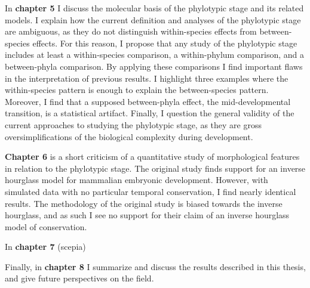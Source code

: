 In \textbf{chapter 5} I discuss the molecular basis of the phylotypic stage and its related models. I explain how the current definition and analyses of the phylotypic stage are ambiguous, as they do not distinguish within-species effects from between-species effects. For this reason, I propose that any study of the phylotypic stage includes at least a within-species comparison, a within-phylum comparison, and a between-phyla comparison. By applying these comparisons I find important flaws in the interpretation of previous results. I highlight three examples where the within-species pattern is enough to explain the between-species pattern. Moreover, I find that a supposed between-phyla effect, the mid-developmental transition, is a statistical artifact. Finally, I question the general validity of the current approaches to studying the phylotypic stage, as they are gross oversimplifications of the biological complexity during development.

\textbf{Chapter 6} is a short criticism of a quantitative study of morphological features in relation to the phylotypic stage. The original study finds support for an inverse hourglass model for mammalian embryonic development. However, with simulated data with no particular temporal conservation, I find nearly identical results. The methodology of the original study is biased towards the inverse hourglass, and as such I see no support for their claim of an inverse hourglass model of conservation.

In \textbf{chapter 7} (scepia)

Finally, in \textbf{chapter 8} I summarize and discuss the results described in this thesis, and give future perspectives on the field.
